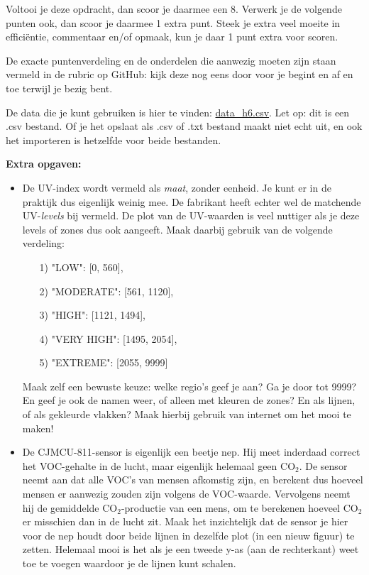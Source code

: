 \documentclass[a4paper,11pt, fleqn]{article}
\begin{document}
Voltooi je deze opdracht, dan scoor je daarmee een 8. Verwerk je de volgende punten ook, dan scoor je daarmee 1 extra punt. Steek je extra veel moeite in effici\"entie, commentaar en/of opmaak, kun je daar 1 punt extra voor scoren.

De exacte puntenverdeling en de onderdelen die aanwezig moeten zijn staan vermeld in de rubric op GitHub: kijk deze nog eens door voor je begint en af en toe terwijl je bezig bent.

De data die je kunt gebruiken is hier te vinden: \href{https://github.com/Ichthus-College-IN/Python-x-Meet-je-leefomgeving/blob/main/inc/h6/data_h6.csv}{data\_h6.csv}. Let op: dit is een .csv bestand. Of je het opslaat als .csv of .txt bestand maakt niet echt uit, en ook het importeren is hetzelfde voor beide bestanden.

\bigbreak
{\bf Extra opgaven:}
\begin{itemize}
	\item De UV-index wordt vermeld als {\it maat}, zonder eenheid. Je kunt er in de praktijk dus eigenlijk weinig mee. De fabrikant heeft echter wel de matchende UV-{\it levels} bij vermeld. De plot van de UV-waarden is veel nuttiger als je deze levels of zones dus ook aangeeft. Maak daarbij gebruik van de volgende verdeling:
	\begin{itemize}
		\item[1)] "LOW": [0, 560],
		\item[2)] "MODERATE": [561, 1120],
		\item[3)] "HIGH": [1121, 1494],
		\item[4)] "VERY HIGH": [1495, 2054],
		\item[5)] "EXTREME": [2055, 9999] 
	\end{itemize}
	Maak zelf een bewuste keuze: welke regio's geef je aan? Ga je door tot 9999? En geef je ook de namen weer, of alleen met kleuren de zones? En als lijnen, of als gekleurde vlakken? Maak hierbij gebruik van internet om het mooi te maken!
	\item De CJMCU-811-sensor is eigenlijk een beetje nep. Hij meet inderdaad correct het VOC-gehalte in de lucht, maar eigenlijk helemaal geen CO$_2$. De sensor neemt aan dat alle VOC's van mensen afkomstig zijn, en berekent dus hoeveel mensen er aanwezig zouden zijn volgens de VOC-waarde. Vervolgens neemt hij de gemiddelde CO$_2$-productie van een mens, om te berekenen hoeveel CO$_2$ er misschien dan in de lucht zit. Maak het inzichtelijk dat de sensor je hier voor de nep houdt door beide lijnen in dezelfde plot (in een nieuw figuur) te zetten. Helemaal mooi is het als je een tweede y-as (aan de rechterkant) weet toe te voegen waardoor je de lijnen kunt schalen.
\end{itemize}
\end{document}
